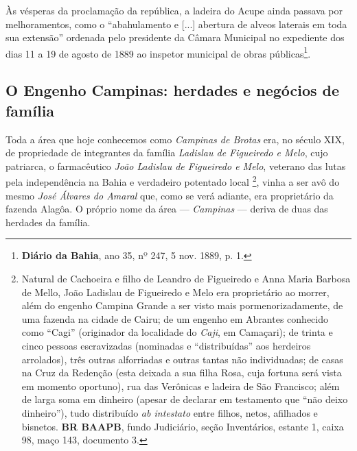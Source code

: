 Às vésperas da proclamação da república, a ladeira do Acupe ainda passava por melhoramentos, como o ``abahulamento e [...] abertura de alveos laterais em toda sua extensão'' ordenada pelo presidente da Câmara Municipal no expediente dos dias 11 a 19 de agosto de 1889 ao inspetor municipal de obras públicas\footnote{\textbf{Diário da Bahia}, ano 35, nº 247, 5 nov. 1889, p. 1.}.

\subsection{O Engenho Campinas: herdades e negócios de família}\label{subsec:campinasladislau}

Toda a área que hoje conhecemos como \textit{Campinas de Brotas} era, no século XIX, de propriedade de integrantes da família \textit{Ladislau de Figueiredo e Melo}, cujo patriarca, o farmacêutico \textit{João Ladislau de Figueiredo e Melo}, veterano das lutas pela independência na Bahia e verdadeiro potentado local \cite[p.~59]{REISSILVA1989}\footnote{Natural de Cachoeira e filho de Leandro de Figueiredo e Anna Maria Barbosa de Mello, João Ladislau de Figueiredo e Melo era proprietário ao morrer, além do engenho Campina Grande a ser visto mais pormenorizadamente, de uma fazenda na cidade de Cairu; de um engenho em Abrantes conhecido como ``Cagi'' (originador da localidade do \textit{Caji}, em Camaçari); de trinta e cinco pessoas escravizadas (nominadas e ``distribuídas'' aos herdeiros arrolados), três outras alforriadas e outras tantas não individuadas; de casas na Cruz da Redenção (esta deixada a sua filha Rosa, cuja fortuna será vista em momento oportuno), rua das Verônicas e ladeira de São Francisco; além de larga soma em dinheiro (apesar de declarar em testamento que ``não deixo dinheiro''), tudo distribuído \textit{ab intestato} entre filhos, netos, afilhados e bisnetos. \textbf{BR BAAPB}, fundo Judiciário, seção Inventários, estante 1, caixa 98, maço 143, documento 3.}, vinha a ser avô do mesmo \textit{José Álvares do Amaral} que, como se verá adiante, era proprietário da fazenda Alagôa. O próprio nome da área --- \textit{Campinas} --- deriva de duas das herdades da família.

